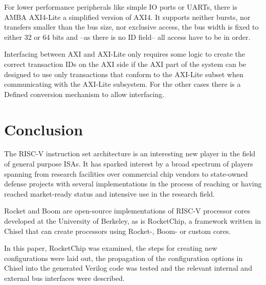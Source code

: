 \documentclass[journal,a4paper]{IEEEtran}
\begin{document}
For lower performance peripherals like simple IO ports or UARTs, there is AMBA AXI4-Lite\cite[B1]{axi} a simplified version of AXI4.
It supports neither bursts, nor transfers smaller than the bus size, nor exclusive access, the bus width is fixed to either 32 or 64 bits and --as there is no ID field-- all access have to be in order.

Interfacing between AXI and AXI-Lite only requires some logic to create the correct transaction IDs on the AXI side if the AXI part of the system can be designed to use only transactions that conform to the AXI-Lite subset when communicating with the AXI-Lite subsystem.
For the other cases there is a Defined conversion mechanism\cite[B1.3]{AXI} to allow interfacing.





\section{Conclusion}
The RISC-V instruction set architecture is an interesting new player in the field of general purpose ISAs.
It has sparked interest by a broad spectrum of players spanning from research facilities over commercial chip vendors to state-owned defense projects with several implementations in the process of reaching or having reached market-ready status and intensive use in the research field.

Rocket and Boom are open-source implementations of RISC-V processor cores developed at the University of Berkeley, as is RocketChip, a framework written in Chisel that can create processors using Rocket-, Boom- or custom cores.

In this paper, RocketChip was examined, the steps for creating new configurations were laid out, the propagation of the configuration options in Chisel into the generated Verilog code was tested and the relevant internal and external bus interfaces were described.

\bigskip
\end{document}
